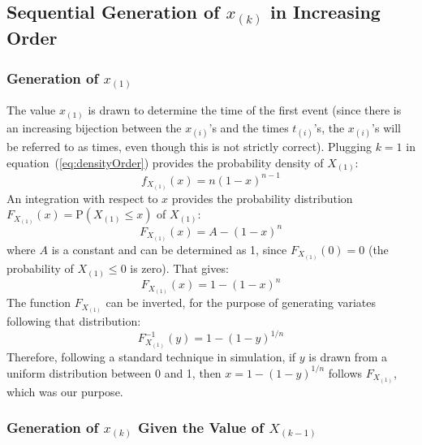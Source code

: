 \documentclass[12pt]{article} %
\begin{document}
\subsection{Sequential Generation of $x_{(k)}$ in Increasing Order}\label{sec:proof}
%
%
%
\subsubsection{Generation of $x_{(1)}$}
The value $x_{(1)}$ is drawn to determine the time of the first event (since there is an increasing bijection between the $x_{(i)}$'s and the times $t_{(i)}$'s, the $x_{(i)}$'s will be referred to as times, even though this is not strictly correct). Plugging $k=1$ in equation~(\ref{eq:densityOrder}) provides the probability density of $X_{(1)}$:
\begin{equation}
f_{X_{(1)}}(x) = n (1-x)^{n-1}
\end{equation}
An integration with respect to $x$ provides the probability distribution $F_{X_{(1)}}(x)=\text{P}(X_{(1)}\leq x)$ of $X_{(1)}$:
\begin{equation}
F_{X_{(1)}}(x) = A - (1-x)^{n}
\end{equation}
where $A$ is a constant and can be determined as 1, since $F_{X_{(1)}}(0)=0$ (the probability of $X_{(1)} \leq 0$ is zero). That gives:
\begin{equation}\label{eq:initcdf}
F_{X_{(1)}}(x) = 1 - (1-x)^{n}
\end{equation}
The function $F_{X_{(1)}}$ can be inverted, for the purpose of generating variates following that distribution:
\begin{equation}\label{eq:initgeneration}
F^{-1}_{X_{(1)}} (y) = 1 - (1-y)^{1/n}
\end{equation}
Therefore, following a standard technique in simulation, if $y$ is drawn from a uniform distribution between 0 and 1, then $x=1 - (1-y)^{1/n}$ follows $F_{X_{(1)}}$, which was our purpose.
%
%
\subsubsection{Generation of $x_{(k)}$ Given the Value of $X_{(k-1)}$}
\end{document}

